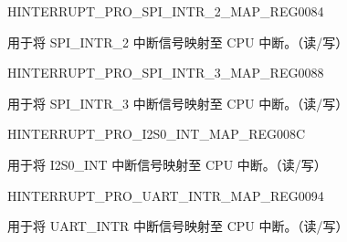 \begin{register}{H}{INTERRUPT\_PRO\_SPI\_INTR\_2\_MAP\_REG}{\hexprefix{}0084}\label{regdesc:INTERRUPTPROSPIINTR2MAPREG}
%
%
\regnewline%
\begin{regdesc}\begin{reglist}
\label{fielddesc:INTERRUPTPROSPIINTR2MAP}\item [INTERRUPT\_PRO\_SPI\_INTR\_2\_MAP] 用于将 SPI\_INTR\_2 中断信号映射至 CPU 中断。（读/写）
\end{reglist}\end{regdesc}
\end{register}


\begin{register}{H}{INTERRUPT\_PRO\_SPI\_INTR\_3\_MAP\_REG}{\hexprefix{}0088}\label{regdesc:INTERRUPTPROSPIINTR3MAPREG}
%
%
\regnewline%
\begin{regdesc}\begin{reglist}
\label{fielddesc:INTERRUPTPROSPIINTR3MAP}\item [INTERRUPT\_PRO\_SPI\_INTR\_3\_MAP] 用于将 SPI\_INTR\_3 中断信号映射至 CPU 中断。（读/写）
\end{reglist}\end{regdesc}
\end{register}


\begin{register}{H}{INTERRUPT\_PRO\_I2S0\_INT\_MAP\_REG}{\hexprefix{}008C}\label{regdesc:INTERRUPTPROI2S0INTMAPREG}
%
%
\regnewline%
\begin{regdesc}\begin{reglist}
\label{fielddesc:INTERRUPTPROI2S0INTMAP}\item [INTERRUPT\_PRO\_I2S0\_INT\_MAP] 用于将 I2S0\_INT 中断信号映射至 CPU 中断。（读/写）
\end{reglist}\end{regdesc}
\end{register}




\begin{register}{H}{INTERRUPT\_PRO\_UART\_INTR\_MAP\_REG}{\hexprefix{}0094}\label{regdesc:INTERRUPTPROUARTINTRMAPREG}
%
%
\regnewline%
\begin{regdesc}\begin{reglist}
\label{fielddesc:INTERRUPTPROUARTINTRMAP}\item [INTERRUPT\_PRO\_UART\_INTR\_MAP] 用于将 UART\_INTR 中断信号映射至 CPU 中断。（读/写）
\end{reglist}\end{regdesc}
\end{register}


